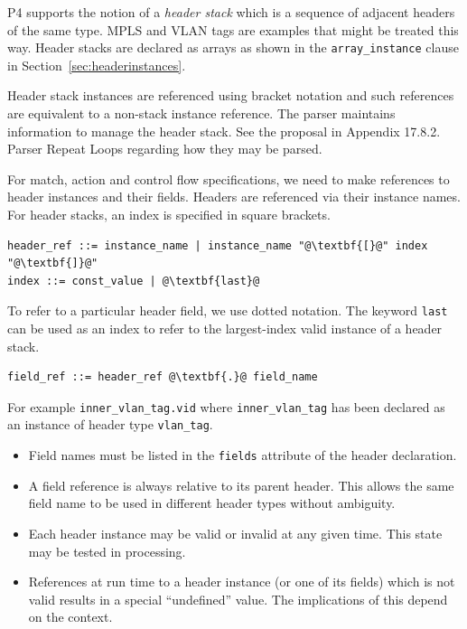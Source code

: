 \documentclass[12pt]{article}
\begin{document}

P4 supports the notion of a \textit{header stack} which is a sequence
of adjacent headers of the same type. MPLS and VLAN tags are examples
that might be treated this way.  Header stacks are declared as arrays
as shown in the \texttt{array_instance} clause in
Section~\ref{sec:headerinstances}.

Header stack instances are referenced using bracket notation and such
references are equivalent to a non-stack instance reference.  The
parser maintains information to manage the header stack. See the
proposal in Appendix 17.8.2. Parser Repeat Loops regarding how they
may be parsed.  


For match, action and control flow specifications, we need to make
references to header instances and their fields. Headers are
referenced via their instance names.  For header stacks, an index is
specified in square brackets.

\begin{lstlisting}[frame=single,backgroundcolor=\color{bnfgreen},escapechar=\@]
header_ref ::= instance_name | instance_name "@\textbf{[}@" index "@\textbf{]}@"
index ::= const_value | @\textbf{last}@
\end{lstlisting}

To refer to a particular header field, we use dotted notation. The
keyword \texttt{last} can be used as an index to refer to the
largest-index valid instance of a header stack.

\begin{lstlisting}[frame=single,backgroundcolor=\color{bnfgreen},escapechar=\@]
field_ref ::= header_ref @\textbf{.}@ field_name
\end{lstlisting}

For example \texttt{inner_vlan_tag.vid} where
\texttt{inner_vlan_tag} has been declared as an instance of header
type \texttt{vlan_tag}.

\begin{itemize}
\item
Field names must be listed in the \texttt{fields} attribute of the
header declaration.
\item
A field reference is always relative to its parent header.  This allows the 
same field name to be used in different header types without ambiguity.
\item
Each header instance may be valid or invalid at any given time. This state 
may be tested in \matchaction processing.
\item
References at run time to a header instance (or one of its fields) which is 
not valid results in a special ``undefined'' value.  The implications of this 
depend on the context.
\end{itemize}
\end{document}
